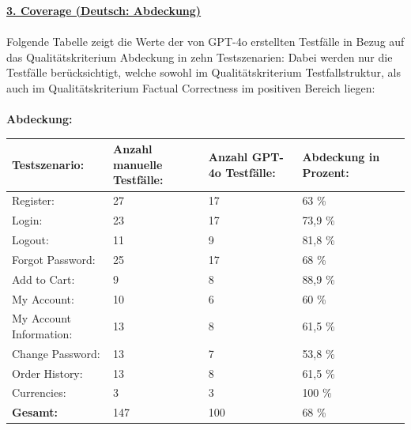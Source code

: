 \documentclass[12pt,toc=bib,toc=listof]{scrreprt}
\begin{document}
\noindent\textbf{\underline{3. Coverage (Deutsch: Abdeckung)}}\\
\\
Folgende Tabelle zeigt die Werte der von GPT-4o erstellten Testfälle in Bezug auf das Qualitätskriterium \glqq Abdeckung\grqq{} in zehn Testszenarien: Dabei werden nur die Testfälle berücksichtigt, welche sowohl im Qualitätskriterium \glqq Testfallstruktur\grqq{}, als auch im Qualitätskriterium \glqq Factual Correctness\grqq{} im positiven Bereich liegen:\\
\\
\textbf{Abdeckung:} 
\begin{table}[H]
 \begin{center}
\begin{tabularx}{\textwidth}{|X|X|X|X|X|}
\hline
\textbf{Testszenario:} & \textbf{Anzahl \newline manuelle \newline Testfälle:} & \textbf{Anzahl \newline GPT-4o \newline Testfälle:} & \textbf{Abdeckung \newline in Prozent:}\\ \hline
Register:  & 27 & 17 & 63 \%       \\ \hline
Login:  & 23 & 17 &  73,9 \%       \\ \hline
Logout:  & 11 & 9 &  81,8 \%       \\ \hline
Forgot \newline Password:  & 25 & 17 &  68 \%       \\ \hline
Add to Cart:  & 9 & 8 & 88,9 \%       \\ \hline
My Account:  & 10 & 6 & 60 \%       \\ \hline
My Account \newline Information: & 13 & 8 & 61,5 \%       \\ \hline
Change \newline Password:  & 13 & 7 & 53,8 \%       \\ \hline
Order History:  & 13 & 8 & 61,5 \%       \\ \hline
Currencies: & 3 & 3 & 100 \% \\ \hline
\textbf{Gesamt:} & 147 & 100 & 68 \% \\ \hline

\end{tabularx}
\end{center}
\end{table}
\end{document}

